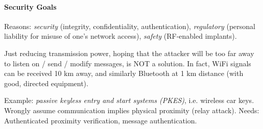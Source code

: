 \paragraph{Security Goals}
Reasons: \textit{security} (integrity, confidentiality, authentication), \textit{regulatory} (personal liability for misuse of one's network access), \textit{safety} (RF-enabled implants).

Just reducing transmission power, hoping that the attacker will be too far away to listen on / send / modify messages, is NOT a solution.
In fact, WiFi signals can be received 10 km away, and similarly Bluetooth at 1 km distance (with good, directed equipment).

Example: \textit{passive keyless entry and start systems (PKES)}, i.e. wireless car keys.
Wrongly assume communication implies physical proximity (relay attack).
Needs: Authenticated proximity verification, message authentication.

